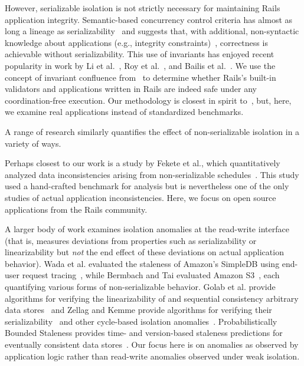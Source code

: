 However, serializable isolation is not strictly necessary for
maintaining Rails application integrity. Semantic-based concurrency
control criteria has almost as long a lineage as
serializability~\cite{eswaran-consistency,ic-survey-two} and suggests
that, with additional, non-syntactic knowledge about applications
(e.g., integrity constraints)~\cite{kung1979optimality}, correctness
is achievable without serializability. This use of invariants has
enjoyed recent popularity in work by Li et al.~\cite{redblue-new}, Roy
et al.~\cite{writes-forest}, and Bailis et al.~\cite{coord-avoid}. We
use the concept of invariant confluence from~\cite{coord-avoid} to
determine whether Rails's built-in validators and applications written
in Rails are indeed safe under any coordination-free execution. Our
methodology is closest in spirit to~\cite{coord-avoid}, but, here, we
examine real applications instead of standardized benchmarks.

 A range of research similarly
quantifies the effect of non-serializable isolation in a variety of
ways.

Perhaps closest to our work is a study by Fekete et al., which
quantitatively analyzed data inconsistencies arising from
non-serializable schedules~\cite{fekete-quantifying}. This study used
a hand-crafted benchmark for analysis but is nevertheless one of the only
studies of actual application inconsistencies. Here, we focus on open
source applications from the Rails community.

A larger body of work examines isolation anomalies at the read-write
interface (that is, measures deviations from properties such as
serializability or linearizability but \textit{not} the end effect of
these deviations on actual application behavior). Wada et
al. evaluated the staleness of Amazon's SimpleDB using end-user
request tracing~\cite{wada-data}, while Bermbach and Tai evaluated
Amazon S3~\cite{bermbach-eventual}, each quantifying various forms of
non-serializable behavior. Golab et al. provide algorithms for
verifying the linearizability of and sequential consistency arbitrary
data stores~\cite{golab-analyzing} and Zellag and Kemme provide
algorithms for verifying their
serializability~\cite{zellag-consistent} and other cycle-based
isolation anomalies~\cite{zellag-real}. Probabilistically Bounded
Staleness provides time- and version-based staleness predictions for
eventually consistent data stores~\cite{pbs}. Our focus here is on
anomalies as observed by application logic rather than read-write
anomalies observed under weak isolation.

